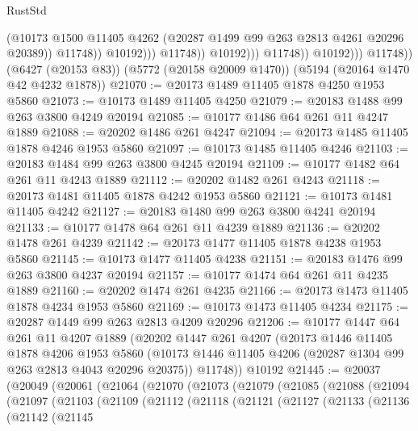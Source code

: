 \begin{lexlean}{RustStd}
\begin{coremodule}
                                      (@10173
                                        @1500
                                        @11405
                                        @4262
                                        (@20287 @1499 @99 @263 @2813 @4261 @20296 @20389))
                                      @11748))
                                  @10192)))
                            @11748))
                        @10192)))
                  @11748))
              @10192)))
        @11748))
    (@6427 (@20153 @83))
    (@5772 (@20158 @20009 @1470))
    (@5194 (@20164 @1470 @42 @4232 @1878))
@21070 := @20173 @1489 @11405 @1878 @4250 @1953 @5860
@21073 := @10173 @1489 @11405 @4250
@21079 := @20183 @1488 @99 @263 @3800 @4249 @20194
@21085 := @10177 @1486 @64 @261 @11 @4247 @1889
@21088 := @20202 @1486 @261 @4247
@21094 := @20173 @1485 @11405 @1878 @4246 @1953 @5860
@21097 := @10173 @1485 @11405 @4246
@21103 := @20183 @1484 @99 @263 @3800 @4245 @20194
@21109 := @10177 @1482 @64 @261 @11 @4243 @1889
@21112 := @20202 @1482 @261 @4243
@21118 := @20173 @1481 @11405 @1878 @4242 @1953 @5860
@21121 := @10173 @1481 @11405 @4242
@21127 := @20183 @1480 @99 @263 @3800 @4241 @20194
@21133 := @10177 @1478 @64 @261 @11 @4239 @1889
@21136 := @20202 @1478 @261 @4239
@21142 := @20173 @1477 @11405 @1878 @4238 @1953 @5860
@21145 := @10173 @1477 @11405 @4238
@21151 := @20183 @1476 @99 @263 @3800 @4237 @20194
@21157 := @10177 @1474 @64 @261 @11 @4235 @1889
@21160 := @20202 @1474 @261 @4235
@21166 := @20173 @1473 @11405 @1878 @4234 @1953 @5860
@21169 := @10173 @1473 @11405 @4234
@21175 := @20287 @1449 @99 @263 @2813 @4209 @20296
@21206 := @10177
    @1447
    @64
    @261
    @11
    @4207
    @1889
    (@20202
      @1447
      @261
      @4207
      (@20173
        @1446
        @11405
        @1878
        @4206
        @1953
        @5860
        (@10173 @1446 @11405 @4206 (@20287 @1304 @99 @263 @2813 @4043 @20296 @20375))
        @11748))
    @10192
@21445 := @20037
    (@20049
      (@20061
        (@21064
          (@21070
            (@21073
              (@21079
                (@21085
                  (@21088
                    (@21094
                      (@21097
                        (@21103
                          (@21109
                            (@21112
                              (@21118
                                (@21121
                                  (@21127
                                    (@21133
                                      (@21136
                                        (@21142
                                          (@21145

\end{coremodule}
\end{lexlean}

